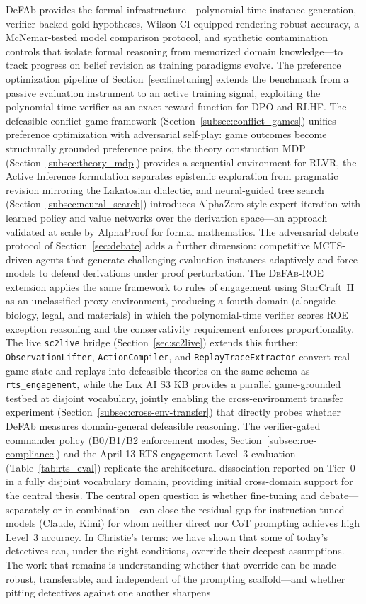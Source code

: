 \documentclass{article}
\theoremstyle{definition}
\begin{document}
DeFAb provides the formal infrastructure---polynomial-time instance generation, verifier-backed gold hypotheses, Wilson-CI-equipped rendering-robust accuracy, a McNemar-tested model comparison protocol, and synthetic contamination controls that isolate formal reasoning from memorized domain knowledge---to track progress on belief revision as training paradigms evolve. The preference optimization pipeline of Section~\ref{sec:finetuning} extends the benchmark from a passive evaluation instrument to an active training signal, exploiting the polynomial-time verifier as an exact reward function for DPO and RLHF. The defeasible conflict game framework (Section~\ref{subsec:conflict_games}) unifies preference optimization with adversarial self-play: game outcomes become structurally grounded preference pairs, the theory construction MDP (Section~\ref{subsec:theory_mdp}) provides a sequential environment for RLVR, the Active Inference formulation separates epistemic exploration from pragmatic revision mirroring the Lakatosian dialectic, and neural-guided tree search (Section~\ref{subsec:neural_search}) introduces AlphaZero-style expert iteration with learned policy and value networks over the derivation space---an approach validated at scale by AlphaProof for formal mathematics. The adversarial debate protocol of Section~\ref{sec:debate} adds a further dimension: competitive MCTS-driven agents that generate challenging evaluation instances adaptively and force models to defend derivations under proof perturbation. The \textsc{DeFAb-ROE} extension applies the same framework to rules of engagement using StarCraft~II as an unclassified proxy environment, producing a fourth domain (alongside biology, legal, and materials) in which the polynomial-time verifier scores ROE exception reasoning and the conservativity requirement enforces proportionality. The live \texttt{sc2live} bridge (Section~\ref{sec:sc2live}) extends this further: \texttt{ObservationLifter}, \texttt{ActionCompiler}, and \texttt{ReplayTraceExtractor} convert real game state and replays into defeasible theories on the same schema as \texttt{rts\_engagement}, while the Lux AI S3 KB provides a parallel game-grounded testbed at disjoint vocabulary, jointly enabling the cross-environment transfer experiment (Section~\ref{subsec:cross-env-transfer}) that directly probes whether DeFAb measures domain-general defeasible reasoning. The verifier-gated commander policy (B0/B1/B2 enforcement modes, Section~\ref{subsec:roe-compliance}) and the April-13 RTS-engagement Level~3 evaluation (Table~\ref{tab:rts_eval}) replicate the architectural dissociation reported on Tier~0 in a fully disjoint vocabulary domain, providing initial cross-domain support for the central thesis. The central open question is whether fine-tuning and debate---separately or in combination---can close the residual gap for instruction-tuned models (Claude, Kimi) for whom neither direct nor CoT prompting achieves high Level~3 accuracy. In Christie's terms: we have shown that some of today's detectives can, under the right conditions, override their deepest assumptions. The work that remains is understanding whether that override can be made robust, transferable, and independent of the prompting scaffold---and whether pitting detectives against one another sharpens 
\end{document}
